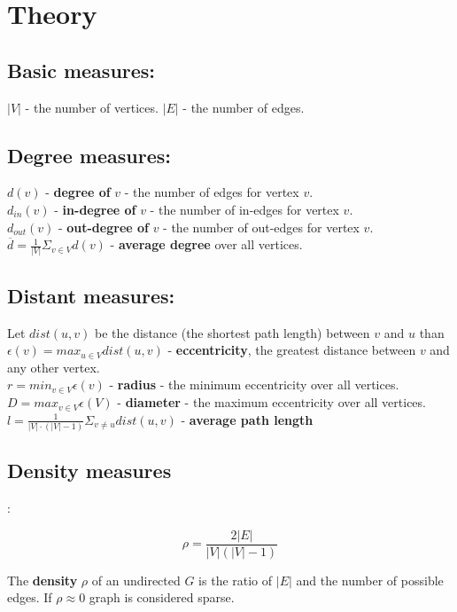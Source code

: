 \section*{Theory}

\subsection*{Basic measures:}

$|V|$ - the number of vertices. 
$|E|$ - the number of edges.

\subsection*{Degree measures:}
$d(v)$ - \textbf{degree of} $v$ - the number of edges for vertex $v$. \\
$d_{in}(v)$ - \textbf{in-degree of} $v$ - the number of in-edges for vertex $v$. \\
$d_{out}(v)$ - \textbf{out-degree of} $v$ - the number of out-edges for vertex $v$. \\
$\overline{d} = \frac{1}{|V|}\Sigma_{v \in V}d(v)$ - \textbf{average degree} over all vertices.

\subsection*{Distant measures:}
Let $dist(u, v)$ be the distance (the shortest path length) between $v$ and $u$ than \\
$\epsilon(v) = max_{u \in V}dist(u, v)$ - \textbf{eccentricity}, the greatest distance between $v$ and any other vertex. \\
$r = min_{v \in V}\epsilon(v)$ - \textbf{radius} - the minimum eccentricity over all vertices. \\
$D = max_{v \in V}\epsilon(V)$ - \textbf{diameter} - the maximum eccentricity over all vertices. \\
$l = \frac{1}{|V|\cdot(|V| - 1)}\Sigma_{v \neq u} dist(u, v)$ - \textbf{average path length}

\subsection*{Density measures}:

\begin{equation*}
    \rho = \frac{2 |E|}{|V|(|V| - 1)}
\end{equation*}

The \textbf{density} $\rho$ of an undirected $G$ is the ratio of $|E|$ and the number of possible edges. 
If $\rho \approx 0$ graph is considered sparse.

